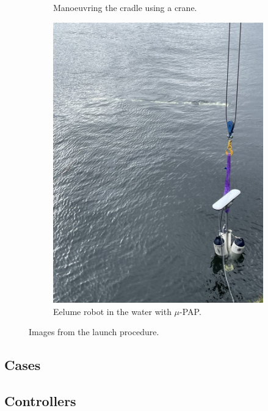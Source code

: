 \begin{figure}
\begin{subfigure}{0.26\textwidth}
        \caption{Manoeuvring the cradle using a crane.}
    \end{subfigure}
    \begin{subfigure}{0.26\textwidth}
        \centering
        \includegraphics[width=\textwidth]{assets/launch/1.jpeg}
        \caption{Eelume robot in the water with \(\mu\)-PAP.}
    \end{subfigure}
    \caption{Images from the launch procedure.}
    \label{fig:eelume:cradle-and-float}
\end{figure}

\subsection{Cases}

\subsection{Controllers}

